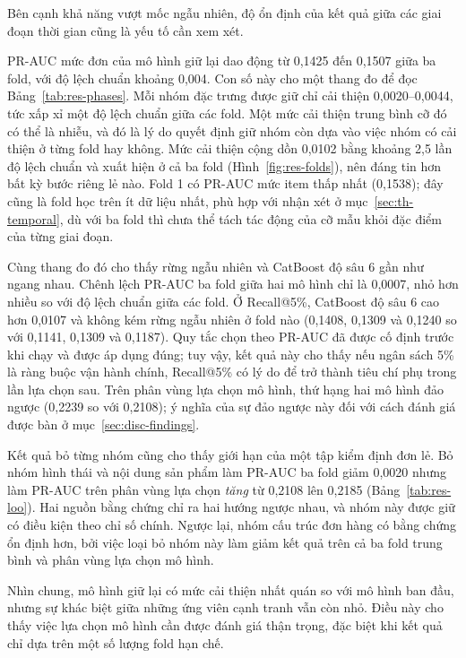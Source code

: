 \documentclass[12pt,a4paper]{report}
\begin{document}
Bên cạnh khả năng vượt mốc ngẫu nhiên, độ ổn định của kết quả giữa các giai đoạn thời gian cũng là yếu tố cần xem xét.

PR-AUC mức đơn của mô hình giữ lại dao động từ 0,1425 đến 0,1507 giữa ba fold, với độ lệch chuẩn khoảng 0,004. Con số này cho một thang đo để đọc Bảng~\ref{tab:res-phases}. Mỗi nhóm đặc trưng được giữ chỉ cải thiện 0,0020--0,0044, tức xấp xỉ một độ lệch chuẩn giữa các fold. Một mức cải thiện trung bình cỡ đó có thể là nhiễu, và đó là lý do quyết định giữ nhóm còn dựa vào việc nhóm có cải thiện ở từng fold hay không. Mức cải thiện cộng dồn 0,0102 bằng khoảng 2,5 lần độ lệch chuẩn và xuất hiện ở cả ba fold (Hình~\ref{fig:res-folds}), nên đáng tin hơn bất kỳ bước riêng lẻ nào. Fold 1 có PR-AUC mức item thấp nhất (0,1538); đây cũng là fold học trên ít dữ liệu nhất, phù hợp với nhận xét ở mục~\ref{sec:th-temporal}, dù với ba fold thì chưa thể tách tác động của cỡ mẫu khỏi đặc điểm của từng giai đoạn.

Cùng thang đo đó cho thấy rừng ngẫu nhiên và CatBoost độ sâu 6 gần như ngang nhau. Chênh lệch PR-AUC ba fold giữa hai mô hình chỉ là 0,0007, nhỏ hơn nhiều so với độ lệch chuẩn giữa các fold. Ở Recall@5\%, CatBoost độ sâu 6 cao hơn 0,0107 và không kém rừng ngẫu nhiên ở fold nào (0,1408, 0,1309 và 0,1240 so với 0,1141, 0,1309 và 0,1187). Quy tắc chọn theo PR-AUC đã được cố định trước khi chạy và được áp dụng đúng; tuy vậy, kết quả này cho thấy nếu ngân sách 5\% là ràng buộc vận hành chính, Recall@5\% có lý do để trở thành tiêu chí phụ trong lần lựa chọn sau. Trên phân vùng lựa chọn mô hình, thứ hạng hai mô hình đảo ngược (0,2239 so với 0,2108); ý nghĩa của sự đảo ngược này đối với cách đánh giá được bàn ở mục~\ref{sec:disc-findings}.

Kết quả bỏ từng nhóm cũng cho thấy giới hạn của một tập kiểm định đơn lẻ. Bỏ nhóm hình thái và nội dung sản phẩm làm PR-AUC ba fold giảm 0,0020 nhưng làm PR-AUC trên phân vùng lựa chọn \emph{tăng} từ 0,2108 lên 0,2185 (Bảng~\ref{tab:res-loo}). Hai nguồn bằng chứng chỉ ra hai hướng ngược nhau, và nhóm này được giữ có điều kiện theo chỉ số chính. Ngược lại, nhóm cấu trúc đơn hàng có bằng chứng ổn định hơn, bởi việc loại bỏ nhóm này làm giảm kết quả trên cả ba fold trung bình và phân vùng lựa chọn mô hình.

Nhìn chung, mô hình giữ lại có mức cải thiện nhất quán so với mô hình ban đầu, nhưng sự khác biệt giữa những ứng viên cạnh tranh vẫn còn nhỏ. Điều này cho thấy việc lựa chọn mô hình cần được đánh giá thận trọng, đặc biệt khi kết quả chỉ dựa trên một số lượng fold hạn chế.
\end{document}
